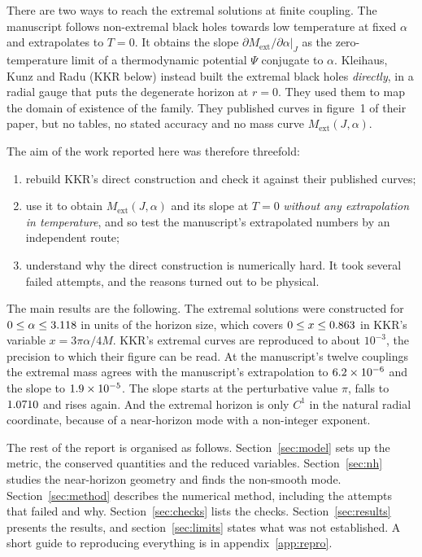 \documentclass[11pt,a4paper]{article}
\newcommand{\ext}{\mathrm{ext}}
\begin{document}
There are two ways to reach the extremal solutions at finite coupling. The
manuscript follows non-extremal black holes towards low temperature at fixed
$\alpha$ and extrapolates to $T=0$. It obtains the slope
$\partial M_\ext/\partial\alpha|_J$ as the zero-temperature limit of a
thermodynamic potential $\Psi$ conjugate to $\alpha$. Kleihaus, Kunz and Radu
(KKR below) \cite{KKR2023} instead built the extremal black holes
\emph{directly}, in a radial gauge that puts the degenerate horizon at $r=0$.
They used them to map the domain of existence of the family. They published
curves in figure~1 of their paper, but no tables, no stated accuracy and no
mass curve $M_\ext(J,\alpha)$.

The aim of the work reported here was therefore threefold:
\begin{enumerate}
\item rebuild KKR's direct construction and check it against their published
curves;
\item use it to obtain $M_\ext(J,\alpha)$ and its slope at $T=0$ \emph{without
any extrapolation in temperature}, and so test the manuscript's extrapolated
numbers by an independent route;
\item understand why the direct construction is numerically hard. It took
several failed attempts, and the reasons turned out to be physical.
\end{enumerate}

The main results are the following. The extremal solutions were constructed for
$0\le\alpha\le3.118$ in units of the horizon size, which covers
$0\le x\le0.863$ in KKR's variable $x=3\pi\alpha/4M$. KKR's extremal curves are
reproduced to about $10^{-3}$, the precision to which their figure can be read.
At the manuscript's twelve couplings the extremal mass agrees with the
manuscript's extrapolation to $6.2\times10^{-6}$ and the slope to $1.9\times10^{-5}$.
The slope starts at the perturbative value $\pi$, falls to $1.0710$ and rises
again. And the extremal horizon is only $C^1$ in the natural radial coordinate,
because of a near-horizon mode with a non-integer exponent.

The rest of the report is organised as follows. Section~\ref{sec:model} sets up
the metric, the conserved quantities and the reduced variables.
Section~\ref{sec:nh} studies the near-horizon geometry and finds the non-smooth
mode. Section~\ref{sec:method} describes the numerical method, including the
attempts that failed and why. Section~\ref{sec:checks} lists the checks.
Section~\ref{sec:results} presents the results, and section~\ref{sec:limits}
states what was not established. A short guide to reproducing everything is in
appendix~\ref{app:repro}.
\end{document}
